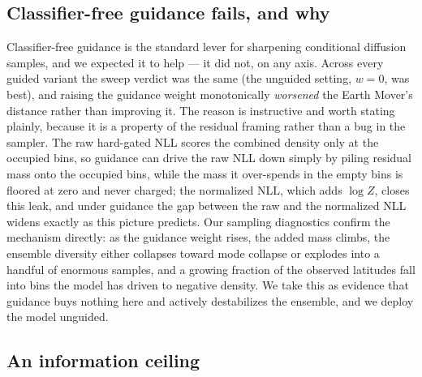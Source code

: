 \documentclass[twocolumn]{aastex631}
\begin{document}
\subsection{Classifier-free guidance fails, and why}
\label{sec:guidance}

Classifier-free guidance is the standard lever for sharpening conditional
diffusion samples, and we expected it to help --- it did not, on any axis. Across
every guided variant the sweep verdict was the same (the unguided setting,
$w=0$, was best), and raising the guidance weight monotonically \emph{worsened}
the Earth Mover's distance rather than improving it. The reason is instructive
and worth stating plainly, because it is a property of the residual framing
rather than a bug in the sampler. The raw hard-gated NLL scores the combined
density only at the occupied bins, so guidance can drive the raw NLL down simply
by piling residual mass onto the occupied bins, while the mass it over-spends in
the empty bins is floored at zero and never charged; the normalized NLL, which
adds $\log Z$, closes this leak, and under guidance the gap between the raw and
the normalized NLL widens exactly as this picture predicts. Our sampling
diagnostics confirm the mechanism directly: as the guidance weight rises, the
added mass climbs, the ensemble diversity either collapses toward mode collapse
or explodes into a handful of enormous samples, and a growing fraction of the
observed latitudes fall into bins the model has driven to negative density. We
take this as evidence that guidance buys nothing here and actively destabilizes
the ensemble, and we deploy the model unguided.

\subsection{An information ceiling}
\label{sec:ceiling}
\end{document}
